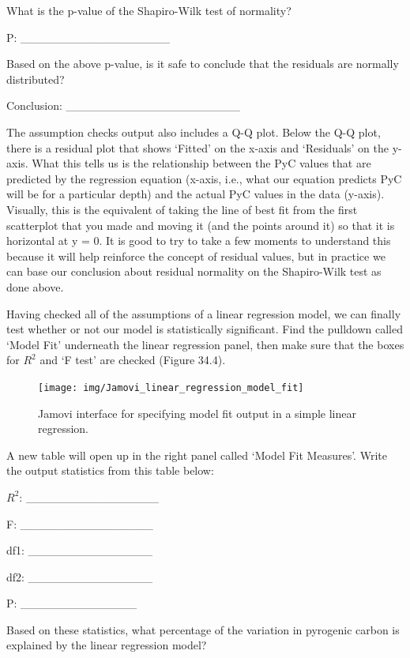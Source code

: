 \documentclass[
]{scrbook}
\begin{document}
What is the p-value of the Shapiro-Wilk test of normality?

P: \_\_\_\_\_\_\_\_\_\_\_\_\_\_\_\_\_\_

Based on the above p-value, is it safe to conclude that the residuals are normally distributed?

Conclusion: \_\_\_\_\_\_\_\_\_\_\_\_\_\_\_\_\_\_\_\_\_

The assumption checks output also includes a Q-Q plot.
Below the Q-Q plot, there is a residual plot that shows `Fitted' on the x-axis and `Residuals' on the y-axis.
What this tells us is the relationship between the PyC values that are predicted by the regression equation (x-axis, i.e., what our equation predicts PyC will be for a particular depth) and the actual PyC values in the data (y-axis).
Visually, this is the equivalent of taking the line of best fit from the first scatterplot that you made and moving it (and the points around it) so that it is horizontal at y = 0.
It is good to try to take a few moments to understand this because it will help reinforce the concept of residual values, but in practice we can base our conclusion about residual normality on the Shapiro-Wilk test as done above.

Having checked all of the assumptions of a linear regression model, we can finally test whether or not our model is statistically significant.
Find the pulldown called `Model Fit' underneath the linear regression panel, then make sure that the boxes for \(R^{2}\) and `F test' are checked (Figure 34.4).

\begin{figure}
\texttt{[image: img/Jamovi\_linear\_regression\_model\_fit]} \caption{Jamovi interface for specifying model fit output in a simple linear regression.}\label{fig:unnamed-chunk-178}
\end{figure}

A new table will open up in the right panel called `Model Fit Measures'.
Write the output statistics from this table below:

\(R^{2}\): \_\_\_\_\_\_\_\_\_\_\_\_\_\_\_\_

F: \_\_\_\_\_\_\_\_\_\_\_\_\_\_\_\_

df1: \_\_\_\_\_\_\_\_\_\_\_\_\_\_\_

df2: \_\_\_\_\_\_\_\_\_\_\_\_\_\_\_

P: \_\_\_\_\_\_\_\_\_\_\_\_\_\_

Based on these statistics, what percentage of the variation in pyrogenic carbon is explained by the linear regression model?
\end{document}
